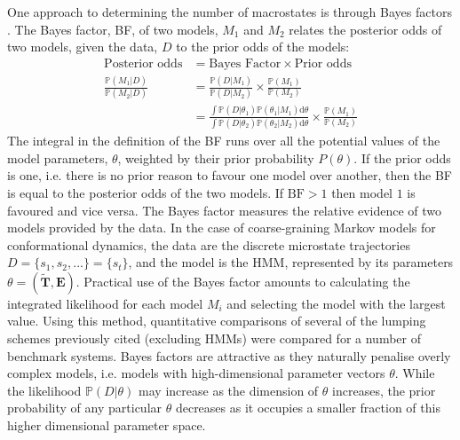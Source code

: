 One approach to determining the number of macrostates is through Bayes factors \cite{kassBayesFactors1995}. The Bayes factor, BF, of two models, $M_{1}$ and $M_{2}$ relates the posterior odds of two models, given the data, $D$ to the prior odds of the models\cite{kassBayesFactors1995}:
\begin{align}
\text{Posterior odds} & = \text{Bayes Factor} \times \text{Prior odds} \\
\frac{ \mathbb{P}(M_1|D) }{ \mathbb{P}(M_2|D) } & = \frac{ \mathbb{P}(D|M_1) }{ \mathbb{P}(D|M_2) } \times \frac{ \mathbb{P}(M_1) }{ \mathbb{P}(M_2) }\\
& = \frac{\int \mathbb{P}\left( D | \theta_{1} \right)\mathbb{P}(\theta_{1}|M_{1}) \mathrm{d}\theta}{\int \mathbb{P}\left( D | \theta_{2} \right)\mathbb{P}(\theta_{2}|M_{2}) \mathrm{d}\theta} \times \frac{\mathbb{P}(M_1)}{\mathbb{P}(M_2)}
\end{align}
The integral in the definition of the BF runs over all the potential values of the model parameters, $\theta$, weighted by their prior probability $P(\theta)$. If the prior odds is one, i.e. there is no prior reason to favour one model over another, then the BF is equal to the posterior odds of the two models. If $\textrm{BF} > 1$ then model $1$ is favoured and vice versa. The Bayes factor measures the relative evidence of two models provided by the data\cite{kassBayesFactors1995}. In the case of coarse-graining Markov models for conformational dynamics, the data are the discrete microstate trajectories $D = \{s_1, s_2, ...\}= \{s_t\}$, and the model is the HMM, represented by its parameters $\theta = (\tilde{\mathbf{T}}, \mathbf{E})$\cite{bacalladoBayesianComparisonMarkov2009a}. Practical use of the Bayes factor amounts to calculating the integrated likelihood  for each model $M_i$ and selecting the model with the largest value. Using this method, quantitative comparisons of several of the lumping schemes previously cited  (excluding HMMs) were  compared for a number of benchmark systems\cite{bowmanQuantitativeComparisonAlternative2013}. Bayes factors are attractive as they naturally penalise overly complex models, i.e. models with high-dimensional parameter vectors $\theta$. While the likelihood $\mathbb{P}(D|\theta)$ may increase as the dimension of $\theta$ increases, the prior probability of any particular $\theta$ decreases as it occupies a smaller fraction of this higher dimensional parameter space\cite{kassBayesFactors1995,mackay2003information}.


